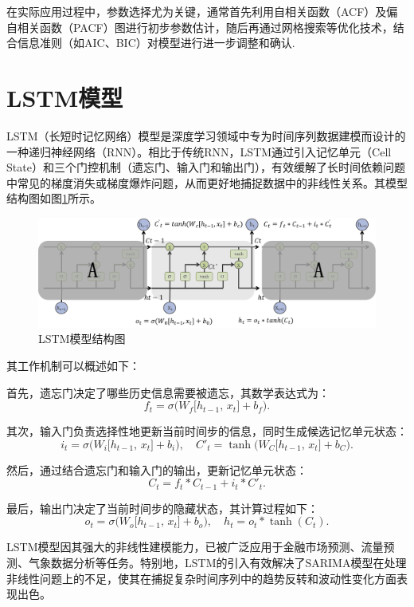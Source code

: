 在实际应用过程中，参数选择尤为关键，通常首先利用自相关函数（ACF）及偏自相关函数（PACF）图进行初步参数估计，随后再通过网格搜索等优化技术，结合信息准则（如AIC、BIC）对模型进行进一步调整和确认.

\section{LSTM模型}

LSTM（长短时记忆网络）模型是深度学习领域中专为时间序列数据建模而设计的一种递归神经网络（RNN）。相比于传统RNN，LSTM通过引入记忆单元（Cell State）和三个门控机制（遗忘门、输入门和输出门），有效缓解了长时间依赖问题中常见的梯度消失或梯度爆炸问题，从而更好地捕捉数据中的非线性关系。其模型结构图如图\ref{fig:LSTM模型结构图}所示。

\begin{figure}[H]
    \centering
    \includegraphics[width=1\linewidth]{figure/LSTM模型结构图.png}
    \caption{LSTM模型结构图}
    \label{fig:LSTM模型结构图}
\end{figure}

其工作机制可以概述如下：

首先，遗忘门决定了哪些历史信息需要被遗忘，其数学表达式为：
\[
f_t = \sigma\Big(W_f\big[h_{t-1},\,x_t\big] + b_f\Big).
\]

其次，输入门负责选择性地更新当前时间步的信息，同时生成候选记忆单元状态：
\[
i_t = \sigma\Big(W_i\big[h_{t-1},\,x_t\big] + b_i\Big), \quad 
C'_t = \tanh\Big(W_C\big[h_{t-1},\,x_t\big] + b_C\Big).
\]

然后，通过结合遗忘门和输入门的输出，更新记忆单元状态：
\[
C_t = f_t \ast C_{t-1} + i_t \ast C'_t.
\]

最后，输出门决定了当前时间步的隐藏状态，其计算过程如下：
\[
o_t = \sigma\Big(W_o\big[h_{t-1},\,x_t\big] + b_o\Big), \quad 
h_t = o_t \ast \tanh(C_t).
\]

LSTM模型因其强大的非线性建模能力，已被广泛应用于金融市场预测、流量预测、气象数据分析等任务。特别地，LSTM的引入有效解决了SARIMA模型在处理非线性问题上的不足，使其在捕捉复杂时间序列中的趋势反转和波动性变化方面表现出色。

